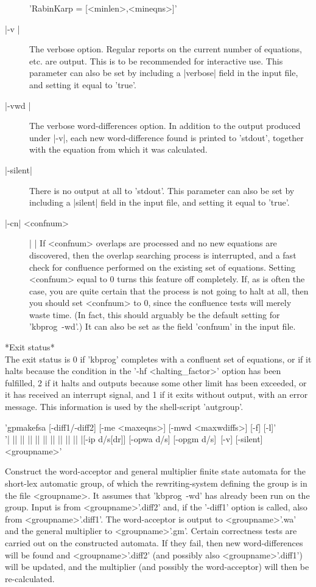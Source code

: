 \begin{description}
'RabinKarp \:= [<minlen>,<mineqns>]'
\item[|-v |]
The verbose option. Regular reports on the current number of equations, etc. are
output. This is to be recommended for interactive use.
This parameter can also be set by including a |verbose| field in the input
file, and setting it equal to 'true'.
\item[|-vwd |]
The verbose word-differences option. In addition to the output produced
under |-v|, each new word-difference found is printed to 'stdout', together
with the equation from which it was calculated.
\item[|-silent|]
There is no output at all to 'stdout'.
This parameter can also be set by including a |silent| field in the input
file, and setting it equal to 'true'.
\item[|-cn| <confnum>] | |\newline
If <confnum> overlaps are processed and no new equations are discovered, then
the overlap searching process is interrupted, and a fast check for
confluence performed on the existing set of equations.
Setting <confnum> equal to 0 turns this feature off completely.
If, as is often the case, you are quite certain that the process is not going
to halt at all, then you should set <confnum> to 0, since the confluence
tests will merely waste time. (In fact, this should arguably be the
default setting for 'kbprog\ -wd'.)
It can also be set as the field 'confnum' in the input file.
\end{description}

*Exit status*\\
The exit status is 0 if 'kbprog' completes with a confluent set of equations,
or if it halts because the condition in the '-hf <halting\_factor>' option
has been fulfilled,
2 if it halts and outputs because some other limit has
been exceeded, or it has received an interrupt signal, and 1 if it exits
without output, with an error message.
This information is used by the shell-script 'autgroup'.


'gpmakefsa  [-diff1/-diff2] [-me <maxeqns>] [-mwd <maxwdiffs>] [-f] [-l]'\\
'| || || || || || || || || || |[-ip d/s[dr]] [-opwa d/s] [-opgm d/s]\
[-v] [-silent] <groupname>'

Construct the word-acceptor and general multiplier finite state automata
for the short-lex automatic group, of which the rewriting-system defining
the group is in the file <groupname>.
It assumes that 'kbprog\ -wd' has already been run on the group.
Input is from <groupname>'.diff2' and, if
the '-diff1' option is called, also from <groupname>'.diff1'. The
word-acceptor is output to <groupname>'.wa' and the general multiplier to
<groupname>'.gm'. Certain correctness tests are carried out on the
constructed automata. If they fail, then new word-differences will be
found and <groupname>'.diff2' (and possibly also <groupname>'.diff1')
will be updated, and the multiplier (and possibly the word-acceptor)
will then be re-calculated.

